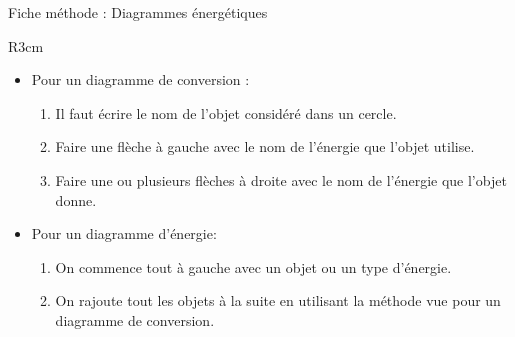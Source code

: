 \documentclass[10pt]{article}
\newcommand{\titre}{Fiche méthode : Diagrammes énergétiques} %
\begin{document}
\begin{titlebox}{\titre}

    \begin{wrapfigure}[]{R}{3cm}
        \vspace{-50pt}
    \end{wrapfigure}
    \hphantom{0pt}      
        \begin{itemize}
            \item Pour un diagramme de conversion :
                \begin{enumerate}
                    \item Il faut écrire le nom de l'objet considéré dans un cercle.
                    \item Faire une flèche à gauche avec le nom de l'énergie que l'objet utilise.
                    \item Faire une ou plusieurs flèches à droite avec 
                    le nom de l'énergie que l'objet donne.
                \end{enumerate} 

            \item Pour un diagramme d'énergie:
                \begin{enumerate}
                    \item On commence tout à gauche avec un objet ou un type d'énergie.
                    \item On rajoute tout les objets à la suite 
                    en utilisant la méthode vue pour un diagramme de conversion.
                \end{enumerate}
        \end{itemize}


    \end{titlebox} 
\end{document}
